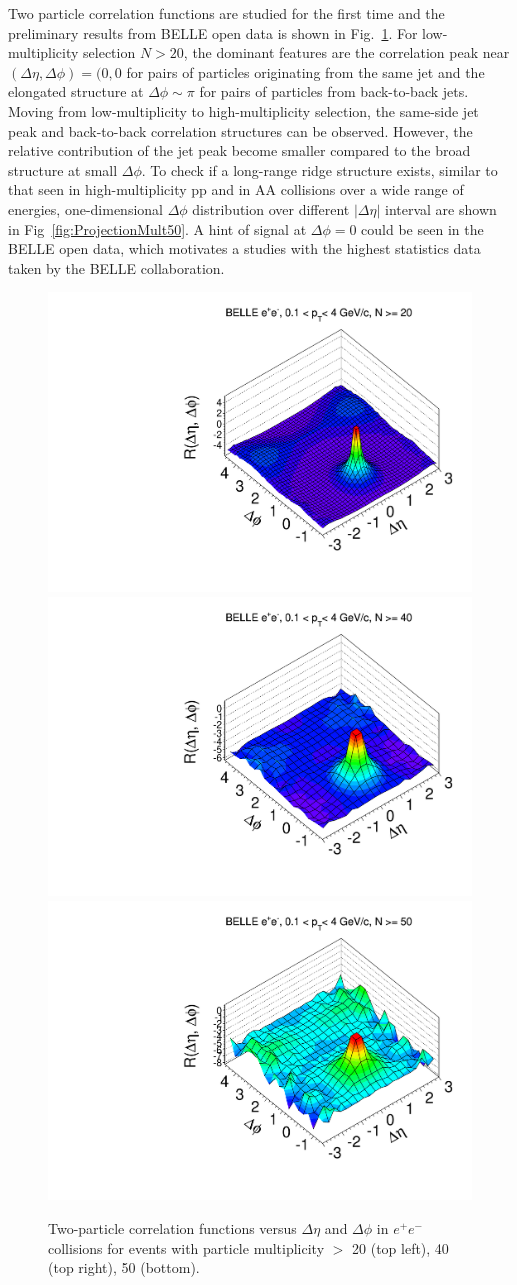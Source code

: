 Two particle correlation functions are studied for the first time and the preliminary results from BELLE open data is shown in Fig.~\ref{fig:ridgeBelle}. For low-multiplicity selection $N>20$, the dominant features are the correlation peak near $(\Delta\eta,\Delta\phi)=(0,0$ for pairs of particles originating from the same jet and the elongated structure at $\Delta\phi\sim\pi$ for pairs of particles from back-to-back jets. Moving from low-multiplicity to high-multiplicity selection, the same-side jet peak and back-to-back correlation structures can be observed. However, the relative contribution of the jet peak become smaller compared to the broad structure at small $\Delta\phi$. To check if a long-range ridge structure exists, similar to that seen in high-multiplicity pp and in AA collisions over a wide range of energies, one-dimensional $\Delta\phi$ distribution over different $|\Delta\eta|$ interval are shown in Fig~\ref{fig:ProjectionMult50}. A hint of signal at $\Delta\phi=0$ could be seen in the BELLE open data, which motivates a studies with the highest statistics data taken by the BELLE collaboration.


\begin{figure}[!htb]
\begin{center}
\includegraphics[width=.45\textwidth]{figures/canvasRidgeBelleMult20CutHigh0.pdf}
\includegraphics[width=.45\textwidth]{figures/canvasRidgeBelleMult40CutHigh0.pdf}
\includegraphics[width=.45\textwidth]{figures/canvasRidgeBelleMult50CutHigh0.pdf}
\caption{Two-particle correlation functions versus $\Delta\eta$ and $\Delta\phi$ in $e^{+}e^{-}$ collisions for events with particle multiplicity $>$ 20 (top left), 40 (top right), 50 (bottom).}
\label{fig:ridgeBelle} 
\end{center}
\end{figure}


